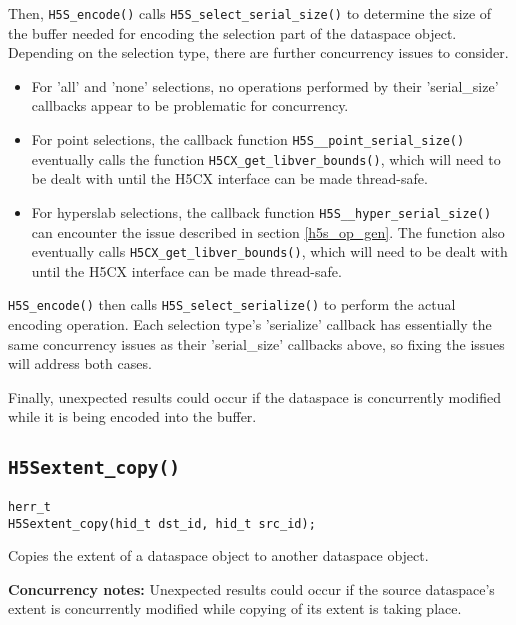 \documentclass[../HDF5_RFC.tex]{subfiles}
\begin{document}
Then, \texttt{H5S\_encode()} calls \texttt{H5S\_select\_serial\_size()} to determine the size of
the buffer needed for encoding the selection part of the dataspace object. Depending on the
selection type, there are further concurrency issues to consider.

\begin{itemize}
    \item For 'all' and 'none' selections, no operations performed by their 'serial\_size' callbacks
          appear to be problematic for concurrency.
    \item For point selections, the callback function \texttt{H5S\_\_point\_serial\_size()} eventually
          calls the function \texttt{H5CX\_get\_libver\_bounds()}, which will need to be dealt with
          until the H5CX interface can be made thread-safe.
    \item For hyperslab selections, the callback function \texttt{H5S\_\_hyper\_serial\_size()} can
          encounter the issue described in section \ref{h5s_op_gen}. The function also eventually
          calls \texttt{H5CX\_get\_libver\_bounds()}, which will need to be dealt with until the H5CX
          interface can be made thread-safe.
\end{itemize}

\texttt{H5S\_encode()} then calls \texttt{H5S\_select\_serialize()} to perform the actual
encoding operation. Each selection type's 'serialize' callback has essentially the same concurrency
issues as their 'serial\_size' callbacks above, so fixing the issues will address both cases.

Finally, unexpected results could occur if the dataspace is concurrently modified while it is being
encoded into the buffer.

\subsection{\texttt{H5Sextent\_copy()}}
\label{apdx:h5s_func_h5sextent_copy}

\begin{verbatim}
herr_t
H5Sextent_copy(hid_t dst_id, hid_t src_id);
\end{verbatim}

Copies the extent of a dataspace object to another dataspace object.

\textbf{Concurrency notes:} Unexpected results could occur if the source dataspace's extent is
concurrently modified while copying of its extent is taking place.
\end{document}
